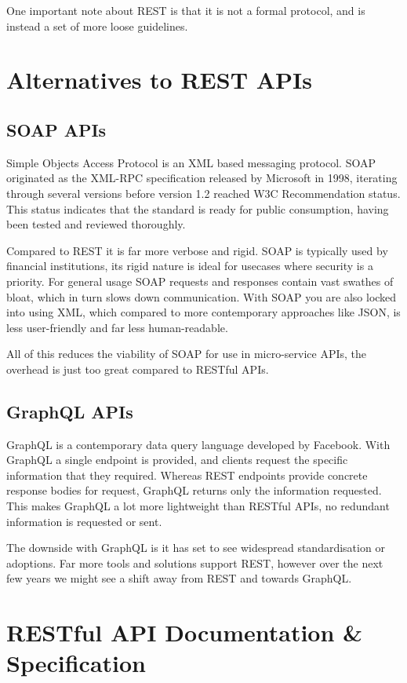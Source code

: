 One important note about REST is that it is not a formal protocol, and is instead a set of more loose guidelines. 

\section{Alternatives to REST APIs}
\subsection{SOAP APIs}
Simple Objects Access Protocol is an XML based messaging protocol. SOAP originated as the XML-RPC specification \cite{xmlrpc} released by Microsoft in 1998, iterating through several versions before version 1.2 \cite{soap1.2} reached W3C Recommendation status. This status indicates that the standard is ready for public consumption, having been tested and reviewed thoroughly.

Compared to REST it is far more verbose and rigid. SOAP is typically used by financial institutions, its rigid nature is ideal for usecases where security is  a priority. For general usage SOAP requests and responses contain vast swathes of bloat, which in turn slows down communication. With SOAP you are also locked into using XML, which compared to more contemporary approaches like JSON, is less user-friendly and far less human-readable.

All of this reduces the viability of SOAP for use in micro-service APIs, the overhead is just too great compared to RESTful APIs.

\subsection{GraphQL APIs}
GraphQL is a contemporary data query language developed by Facebook. With GraphQL a single endpoint is provided, and clients request the specific information that they required. Whereas REST endpoints provide concrete response bodies for request, GraphQL returns only the information requested. This makes GraphQL a lot more lightweight than RESTful APIs, no redundant information is requested or sent.

The downside with GraphQL is it has set to see widespread standardisation or adoptions. Far more tools and solutions support REST, however over the next few years we might see a shift away from REST and towards GraphQL. 
\section{RESTful API Documentation \& Specification}
